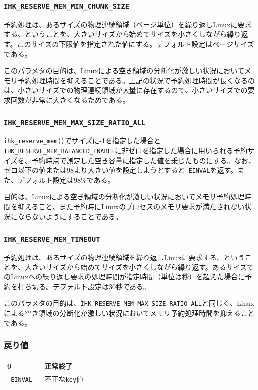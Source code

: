 \documentclass[twoside,11pt,fleqn]{book}
\begin{document}
\subsubsection*{\texttt{IHK\_RESERVE\_MEM\_MIN\_CHUNK\_SIZE}}
予約処理は、あるサイズの物理連続領域（ページ単位）を繰り返しLinuxに要求する、ということを、大きいサイズから始めてサイズを小さくしながら繰り返す。このサイズの下限値を指定された値にする。デフォルト設定はページサイズである。

このパラメタの目的は、Linuxによる空き領域の分断化が激しい状況においてメモリ予約処理時間を抑えることである。上記の状況で予約処理時間が長くなるのは、小さいサイズでの物理連続領域が大量に存在するので、小さいサイズでの要求回数が非常に大きくなるためである。

\subsubsection*{\texttt{IHK\_RESERVE\_MEM\_MAX\_SIZE\_RATIO\_ALL}}
\verb|ihk_reserve_mem()|でサイズに-1を指定した場合と\verb|IHK_RESERVE_MEM_BALANCED_ENABLE|に非ゼロを指定した場合に用いられる予約サイズを、予約時点で測定した空き容量に指定した値を乗じたものにする。なお、ゼロ以下の値または98より大きい値を設定しようとすると\verb:-EINVAL:を返す。また、デフォルト設定は98\%である。

目的は、Linuxによる空き領域の分断化が激しい状況においてメモリ予約処理時間を抑えること、また予約時にLinuxのプロセスのメモリ要求が満たされない状況にならないようにすることである。

\subsubsection*{\texttt{IHK\_RESERVE\_MEM\_TIMEOUT}}
予約処理は、あるサイズの物理連続領域を繰り返しLinuxに要求する、ということを、大きいサイズから始めてサイズを小さくしながら繰り返す。あるサイズでのLinuxへの繰り返し要求の処理時間が指定時間（単位は秒）を超えた場合に予約を打ち切る。デフォルト設定は30秒である。

このパラメタの目的は、\texttt{IHK\_RESERVE\_MEM\_MAX\_SIZE\_RATIO\_ALL}と同じく、Linuxによる空き領域の分断化が激しい状況においてメモリ予約処理時間を抑えることである。

\subsubsection*{戻り値}{\quad}
\begin{table}[!h]
\footnotesize
\begin{tabular}{|p{0.20\linewidth}|p{0.66\linewidth}|} \hline
0&正常終了\\ \hline
\texttt{-EINVAL}&不正な\texttt{key}値\\ \hline
\end{tabular}
\vspace{-0em}
\end{table}
\FloatBarrier
\end{document}
